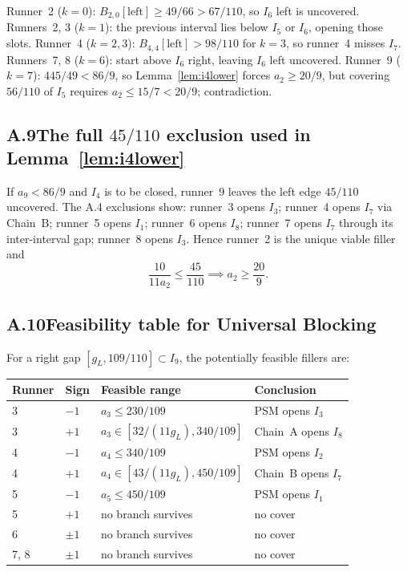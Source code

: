 \documentclass[12pt,a4paper]{amsart}
\theoremstyle{definition}
\theoremstyle{remark}
\begin{document}
Runner~2 ($k=0$): $B_{2,0}[\mathrm{left}]\ge 49/66>67/110$, so $I_6$ left is uncovered.
Runners~2, 3 ($k=1$): the previous interval lies below $I_5$ or $I_6$, opening those slots.
Runner~4 ($k=2,3$): $B_{4,4}[\mathrm{left}]>98/110$ for $k=3$, so runner~4 misses $I_7$.
Runners~7, 8 ($k=6$): start above $I_6$ right, leaving $I_6$ left uncovered.
Runner~9 ($k=7$): $445/49<86/9$, so Lemma~\ref{lem:i4lower} forces $a_2\ge 20/9$,
but covering $56/110$ of $I_5$ requires $a_2\le 15/7<20/9$; contradiction.

\subsection*{A.9\quad The full $45/110$ exclusion used in Lemma~\ref{lem:i4lower}}

If $a_9<86/9$ and $I_4$ is to be closed, runner~9 leaves the left edge $45/110$ uncovered.
The A.4 exclusions show:
runner~3 opens $I_3$; runner~4 opens $I_7$ via Chain~B; runner~5 opens $I_1$;
runner~6 opens $I_8$; runner~7 opens $I_7$ through its inter-interval gap; runner~8 opens $I_3$.
Hence runner~2 is the unique viable filler and
\[
  \frac{10}{11a_2} \le \frac{45}{110} \implies a_2 \ge \frac{20}{9}.
\]

\subsection*{A.10\quad Feasibility table for Universal Blocking}

For a right gap $[g_L,109/110]\subset I_9$, the potentially feasible fillers are:

\begin{center}
\begin{tabular}{llll}
\toprule
Runner & Sign & Feasible range & Conclusion \\
\midrule
3 & $-1$ & $a_3\le 230/109$ & PSM opens $I_3$ \\
3 & $+1$ & $a_3\in[32/(11g_L),340/109]$ & Chain~A opens $I_8$ \\
4 & $-1$ & $a_4\le 340/109$ & PSM opens $I_2$ \\
4 & $+1$ & $a_4\in[43/(11g_L),450/109]$ & Chain~B opens $I_7$ \\
5 & $-1$ & $a_5\le 450/109$ & PSM opens $I_1$ \\
5 & $+1$ & no branch survives & no cover \\
6 & $\pm1$ & no branch survives & no cover \\
7, 8 & $\pm1$ & no branch survives & no cover \\
\bottomrule
\end{tabular}
\end{center}
\end{document}
